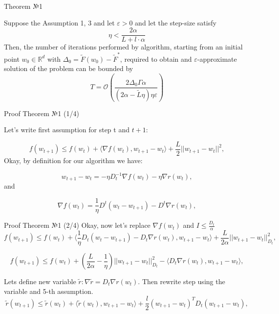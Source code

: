 \documentclass[aspectratio=169, 12pt]{beamer}
\begin{document}
\begin{frame}{Theorem №1}
\begin{theorem}[1]
Suppose the Assumption 1, 3 and let $\varepsilon > 0$ and let the step-size satisfy
\begin{equation*}
    \eta < \frac{2 \alpha}{L + l \cdot \alpha} 
\end{equation*}
Then, the number of iterations performed by algorithm, starting from an initial point $w_0 \in \mathbb{R}^d$ with $\Delta_0 = \tilde{F}(w_0) - \tilde{F}^*$, required to obtain and $\varepsilon$-approximate solution of the problem can be bounded by
\begin{equation*}
      T = \mathcal{O}\left( \frac{2\Delta_0 \Gamma \alpha } {(2\alpha - \tilde{L}\eta) \eta \varepsilon} \right)
\end{equation*}

\end{theorem}
\end{frame}
\begin{frame}{Proof Theorem №1 (1/4)}
    
Let's write first assumption for step t and $t+1$:

\begin{equation*}
    f(w_{t+1}) \leq f(w_t) + \langle \nabla f(w_t), w_{t+1} - w_t \rangle + \frac{L}{2}||w_{t+1} - w_t ||^2,
\end{equation*}
Okay, by definition for our algorithm we have:

\begin{equation*}
w_{t+1} - w_t = -\eta D_t^{-1} \nabla f(w_t) - \eta \nabla r(w_t),
\end{equation*}
and 

\begin{equation*}
\nabla f(w_t) = \frac{1}{\eta} D^t(w_t - w_{t+1}) - D^t \nabla r(w_t),
\end{equation*}

\end{frame}

\begin{frame}{Proof Theorem №1 (2/4)}
    Okay, now let's replace $\nabla f(w_t)$ and $I \leq \frac{D_t}{\alpha}$
\begin{equation*}
    f(w_{t+1}) \leq f(w_t) + \langle \frac{1}{\eta}D_t(w_t - w_{t+1}) - D_t\nabla r(w_t), w_{t+1} - w_t \rangle + \frac{L}{2 \alpha} ||w_{t+1} - w_t||_{D_t}^2,
\end{equation*}

\begin{equation*}
    f(w_{t+1}) \leq f(w_t) + \left(\frac{L}{2 \alpha} - \frac{1}{\eta} \right) ||w_{t+1} - w_t||_{D_t}^2 - \langle D_t \nabla r(w_t), w_{t+1} - w_t \rangle,
\end{equation*}

Lets define new variable $\tilde{r} : \nabla \tilde{r} = D_t \nabla r(w_t)$. Then rewrite step using the variable and 5-th assumption.
\begin{equation*}
    \tilde{r}(w_{t+1}) \leq \tilde{r}(w_t) + \langle \tilde{r}(w_t), w_{t+1} - w_t \rangle + \frac{l}{2} (w_{t+1} - w_t)^T D_t (w_{t+1} - w_t),
\end{equation*}
\end{frame}
\end{document}
